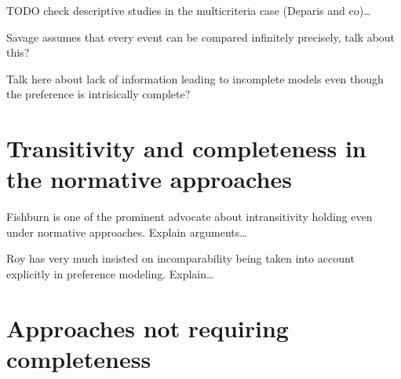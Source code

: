 \documentclass[french, english]{llncs}
\begin{document}
TODO check descriptive studies in the multicriteria case (Deparis and co)…

Savage assumes that every event can be compared infinitely precisely, talk about this?

Talk here about lack of information leading to incomplete models even though the preference is intrisically complete?

\section{Transitivity and completeness in the normative approaches}
Fishburn is one of the prominent advocate about intransitivity holding even under normative approaches. Explain arguments…

Roy has very much insisted on incomparability being taken into account explicitly in preference modeling. Explain…

\section{Approaches not requiring completeness}
\end{document}
